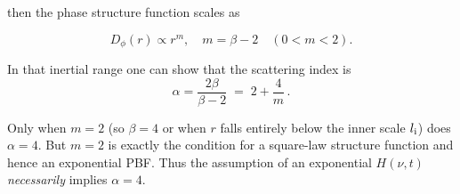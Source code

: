 \documentclass[twocolumn, linenumbers, tra]{aastex631}
\begin{document}
{then the phase structure function scales as 

\begin{equation}
 D_\phi(r)\propto r^m,\quad m=\beta-2\quad(0<m<2).
\end{equation}

In that inertial range one can show \citep{Cordes1986, Romani1986} that the scattering index is 
\begin{equation}
 \alpha=\frac{2\beta}{\beta-2} \;=\;2+\frac{4}{m}\,.
\end{equation}

Only when $m=2$ (so $\beta=4$ or when $r$ falls entirely below the inner scale $l_{\rm i}$) does $\alpha=4$. But $m=2$ is exactly the condition for a square-law structure function and hence an exponential PBF. Thus the assumption of an exponential $H(\nu,t)$ \emph{necessarily} implies $\alpha=4$.







}
\end{document}
